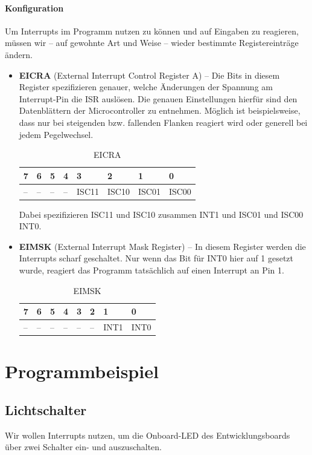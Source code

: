 \documentclass[11pt,a4paper]{scrartcl}
\begin{document}
\paragraph{Konfiguration}
Um Interrupts im Programm nutzen zu können und auf Eingaben zu reagieren, müssen wir -- auf gewohnte Art und Weise -- wieder bestimmte Registereinträge ändern.
\begin{itemize}
\item \textbf{EICRA} (External Interrupt Control Register A) -- Die Bits in diesem Register spezifizieren genauer, welche Änderungen der Spannung am Interrupt-Pin die ISR auslösen. Die genauen Einstellungen hierfür sind den Datenblättern der Microcontroller zu entnehmen. Möglich ist beispielsweise, dass nur bei steigenden bzw. fallenden Flanken reagiert wird oder generell bei jedem Pegelwechsel. 
\begin{table}[h!]
\centering
\begin{tabular}{|p{1cm}|p{1cm}|p{1cm}|p{1cm}|p{1cm}|p{1cm}|p{1cm}|p{1cm}|}
\hline
7 & 6 & 5 & 4 & 3 & 2 & 1 & 0 \\
\hline
-- & -- & -- & -- & ISC11 & ISC10 & ISC01 & ISC00 \\
\hline
\end{tabular}
\caption{EICRA}
\end{table}
Dabei spezifizieren ISC11 und ISC10 zusammen INT1 und ISC01 und ISC00 INT0.
\item \textbf{EIMSK} (External Interrupt Mask Register) -- In diesem Register werden die Interrupts {\glqq}scharf geschaltet{\grqq}. Nur wenn das Bit für INT0 hier auf 1 gesetzt wurde, reagiert das Programm tatsächlich auf einen Interrupt an Pin 1.
\begin{table}[h!]
\centering
\begin{tabular}{|p{1cm}|p{1cm}|p{1cm}|p{1cm}|p{1cm}|p{1cm}|p{1cm}|p{1cm}|}
\hline
7 & 6 & 5 & 4 & 3 & 2 & 1 & 0 \\
\hline
-- & -- & -- & -- & -- & -- & INT1 & INT0 \\
\hline
\end{tabular}
\caption{EIMSK}
\end{table}
\end{itemize}
\section{Programmbeispiel}
\subsection{Lichtschalter}
Wir wollen Interrupts nutzen, um die Onboard-LED des Entwicklungsboards über zwei Schalter ein- und auszuschalten.
\end{document}
